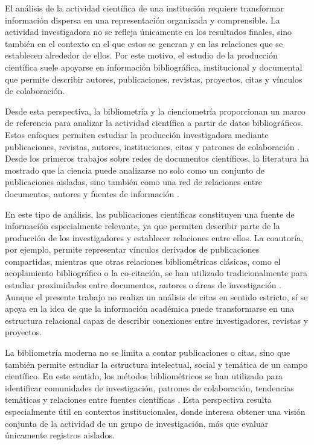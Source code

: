 \documentclass[11pt,spanish,listoffigures,listoftables]{tfgetsinf}
\begin{document}
El análisis de la actividad científica de una institución requiere transformar información dispersa en una representación organizada y comprensible. La actividad investigadora no se refleja únicamente en los resultados finales, sino también en el contexto en el que estos se generan y en las relaciones que se establecen alrededor de ellos. Por este motivo, el estudio de la producción científica suele apoyarse en información bibliográfica, institucional y documental que permite describir autores, publicaciones, revistas, proyectos, citas y vínculos de colaboración.

Desde esta perspectiva, la bibliometría y la cienciometría proporcionan un marco de referencia para analizar la actividad científica a partir de datos bibliográficos. Estos enfoques permiten estudiar la producción investigadora mediante publicaciones, revistas, autores, instituciones, citas y patrones de colaboración \cite{price,moed}. Desde los primeros trabajos sobre redes de documentos científicos, la literatura ha mostrado que la ciencia puede analizarse no solo como un conjunto de publicaciones aisladas, sino también como una red de relaciones entre documentos, autores y fuentes de información \cite{price}.

En este tipo de análisis, las publicaciones científicas constituyen una fuente de información especialmente relevante, ya que permiten describir parte de la producción de los investigadores y establecer relaciones entre ellos. La coautoría, por ejemplo, permite representar vínculos derivados de publicaciones compartidas, mientras que otras relaciones bibliométricas clásicas, como el acoplamiento bibliográfico o la co-citación, se han utilizado tradicionalmente para estudiar proximidades entre documentos, autores o áreas de investigación \cite{kessler,small}. Aunque el presente trabajo no realiza un análisis de citas en sentido estricto, sí se apoya en la idea de que la información académica puede transformarse en una estructura relacional capaz de describir conexiones entre investigadores, revistas y proyectos.

La bibliometría moderna no se limita a contar publicaciones o citas, sino que también permite estudiar la estructura intelectual, social y temática de un campo científico. En este sentido, los métodos bibliométricos se han utilizado para identificar comunidades de investigación, patrones de colaboración, tendencias temáticas y relaciones entre fuentes científicas \cite{zupic}. Esta perspectiva resulta especialmente útil en contextos institucionales, donde interesa obtener una visión conjunta de la actividad de un grupo de investigación, más que evaluar únicamente registros aislados.
\end{document}
